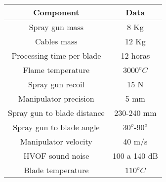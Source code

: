 \begin{center}
\begin{tabular}{  c | c  }
  \hline
  \textbf{Component} & \textbf{Data} \\ \hline
  Spray gun mass & 8 Kg  \\ \hline
  Cables mass & 12 Kg  \\ \hline
  Processing time per blade & 12 horas \\ \hline
  Flame temperature & $3000^oC$ \\ \hline
  Spray gun recoil & 15 N \\ \hline
  Manipulator precision & 5 mm \\ \hline
  Spray gun to blade distance & 230-240 mm \\ \hline
  Spray gun to blade angle & $30^o$-$90^o$ \\ \hline
  Manipulator velocity & 40 m/s \\ \hline
  HVOF sound noise & 100 a 140 dB \\ \hline
  Blade temperature & $110^oC$ \\
  \hline
\end{tabular}
\label{tab::hvof}
\end{center}




